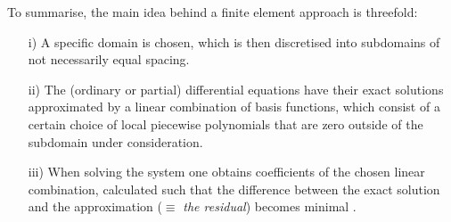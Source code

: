 To summarise, the main idea behind a finite element approach is threefold:
\begin{enumerate}
  \item[i)] A specific domain is chosen, which is then discretised into subdomains of not necessarily equal spacing.
  \item[ii)] The (ordinary or partial) differential equations have their exact solutions approximated by a linear combination of basis functions, which consist of a certain choice of local piecewise polynomials that are zero outside of the subdomain under consideration.
  \item[iii)] When solving the system one obtains coefficients of the chosen linear combination, calculated such that the difference between the exact solution and the approximation ($\equiv$ \emph{the residual}) becomes minimal .
\end{enumerate}



